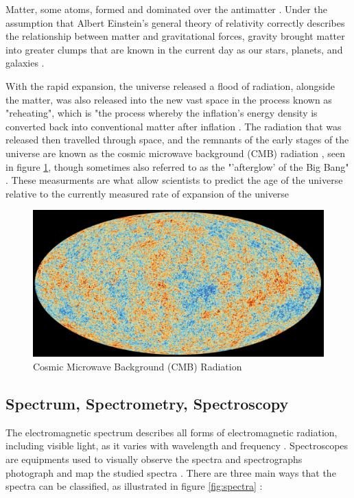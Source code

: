 \documentclass[12pt]{article}
\begin{document}
Matter, some atoms, formed \cite{hubblebigbang} and dominated over the antimatter \cite{britbigbang}.
Under the assumption that Albert Einstein's general theory of relativity correctly describes the relationship between matter and gravitational forces,
gravity brought matter into greater clumps that are known in the current day as our stars, planets, and galaxies
\cite{hubblebigbang}.

With the rapid expansion, the universe released a flood of radiation, alongside the matter, was also released into the new vast space
\cite{britbigbang,spacebigbang}
in the process known as "reheating", which is "the process whereby the inflation's energy density is converted back
into conventional matter after inflation
\cite{reheating}.
The radiation that was released then travelled through space, and the remnants of the early stages of the universe are known
as the cosmic microwave background (CMB) radiation \cite{britbigbang}, seen in figure \ref{fig:cmb}, 
though sometimes also referred to as the "'afterglow' of the Big Bang"
\cite{spacebigbang}.
These measurments are what allow scientists to predict the age of the universe relative to the currently measured rate of expansion of the universe
\cite{hubblebigbang}

\begin{figure} [H]
    \centering
    \includegraphics[width=15cm]{cmb.jpg}
    \caption{\centering \footnotesize{Cosmic Microwave Background (CMB) Radiation \protect\cite{cmbpic}}}
    \label{fig:cmb}
\end{figure}

\subsection{Spectrum, Spectrometry, Spectroscopy} \label{sec:1.2}

The electromagnetic spectrum describes all forms of electromagnetic radiation, including visible light, as it varies with wavelength
and frequency  
\cite{britspectra,hubblespectra}.
Spectroscopes are equipments used to visually observe the spectra and spectrographs photograph and map the studied spectra
\cite{britspectra}.
There are three main ways that the spectra can be classified, as illustrated in figure \ref{fig:spectra} \cite{spectrapic}:
\end{document}
